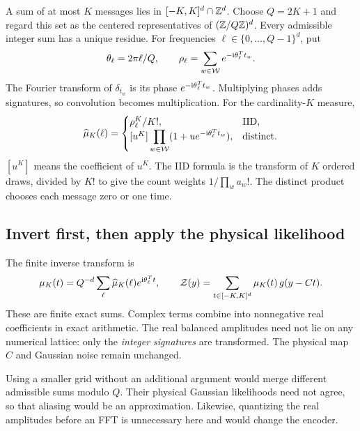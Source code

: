 \documentclass[10pt,a4paper]{article}
\newcommand{\calW}{\mathcal W}
\begin{document}
A sum of at most $K$ messages lies in $[-K,K]^d\cap\mathbb{Z}^d$. Choose $Q=2K+1$ and regard this set as the
centered representatives of $(\mathbb{Z}/Q\mathbb{Z})^d$. Every admissible integer sum has a unique residue.
For frequencies $\ell\in\{0,\ldots,Q-1\}^d$, put
\[
 \theta_\ell=2\pi\ell/Q,\qquad
 \rho_\ell=\sum_{w\in\calW}e^{-{\rm i}\theta_\ell^Tt_w}.
\]
The Fourier transform of $\delta_{t_w}$ is its phase $e^{-{\rm i}\theta_\ell^Tt_w}$.
Multiplying phases adds signatures, so convolution becomes multiplication.
For the cardinality-$K$ measure,
\begin{equation}
 \widehat\mu_K(\ell)=
 \begin{cases}
 \rho_\ell^K/K!,&\text{IID},\\
 [u^K]\displaystyle\prod_{w\in\calW}
       (1+u e^{-{\rm i}\theta_\ell^Tt_w}),&\text{distinct}.
 \end{cases}
 \label{eq:fourier-measure}
\end{equation}
$[u^K]$ means the coefficient of $u^K$. The IID formula is the transform of $K$ ordered draws, divided by
$K!$ to give the count weights $1/\prod_w a_w!$. The distinct product chooses each message zero or one time.

\subsection{Invert first, then apply the physical likelihood}
The finite inverse transform is
\begin{equation}
 \mu_K(t)=Q^{-d}\sum_\ell
       \widehat\mu_K(\ell)e^{{\rm i}\theta_\ell^Tt},\qquad
 \mathcal Z(y)=\sum_{t\in[-K,K]^d}\mu_K(t)\,g(y-Ct).
 \label{eq:fourier-inverse}
\end{equation}
These are finite exact sums. Complex terms combine into nonnegative real coefficients in exact arithmetic.
The real balanced amplitudes need not lie on any numerical lattice: only the \emph{integer signatures} are
transformed. The physical map $C$ and Gaussian noise remain unchanged.

Using a smaller grid without an additional argument would merge different admissible sums modulo $Q$.
Their physical Gaussian likelihoods need not agree, so that aliasing would be an approximation.
Likewise, quantizing the real amplitudes before an FFT is unnecessary here and would change the encoder.

\clearpage
\end{document}
